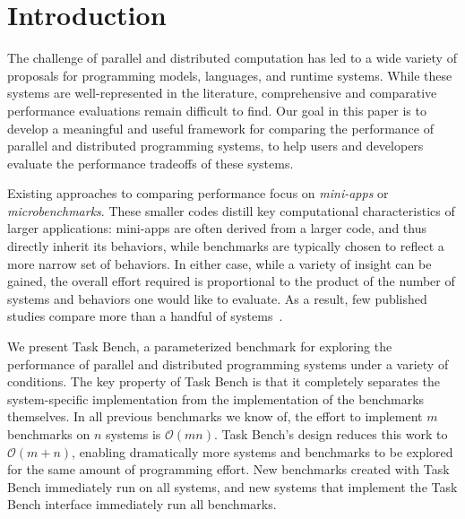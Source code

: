 \section{Introduction}
\label{sec:introduction}

The challenge of parallel and distributed computation has led to a
wide variety of proposals for programming models, languages, and
runtime systems. While these systems are well-represented in the literature, comprehensive and comparative performance evaluations
remain difficult to find. Our
goal in this paper is to develop a meaningful and useful framework for
comparing the performance of parallel and distributed programming
systems, to help users and developers evaluate the performance tradeoffs of these systems.

{\color{blue}

Existing approaches to comparing performance focus on \emph{mini-apps}
or \emph{microbenchmarks}. These smaller codes distill key
computational characteristics of larger applications: mini-apps are
often derived from a larger code, and thus directly inherit its
behaviors, while benchmarks are typically chosen to reflect a more
narrow set of behaviors. In either case, while a variety of insight
can be gained, the overall effort required is proportional to the
product of the number of systems and behaviors one would like to
evaluate. As a result, few published studies compare more than a
handful of systems~\cite{LULESH13, Deakin19}.

}


We present Task Bench, a parameterized benchmark for exploring the performance
of parallel and distributed programming systems under a
variety of conditions.  The key property of Task Bench is that it completely separates
the system-specific implementation from the implementation
of the benchmarks themselves.
In all previous benchmarks we know of, the effort to implement $m$ benchmarks on $n$
systems is $\mathcal{O}(mn)$.  Task Bench's design reduces this work to $\mathcal{O}(m + n)$,
enabling dramatically more systems and benchmarks to be explored for the same amount of programming
effort.  New benchmarks created with Task Bench
immediately run on all systems, and new systems that implement the Task Bench interface immediately run all
benchmarks. 

